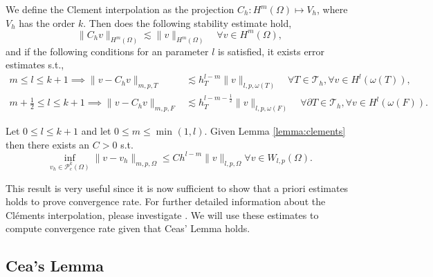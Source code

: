 \begin{lemma}
    \label{lemma:clements}

We define the Clement interpolation as the projection
$C_{h}: H^{m} \left( \Omega  \right) \mapsto V_{h}$, where $V_{h}$ has the order $k$. Then does the following stability estimate hold,
\[
 \| C_{h} v \|_{H^{m}\left( \Omega  \right)   }^{  } \lesssim \| v \|_{ H^{m}\left( \Omega  \right)  }^{  } \quad \forall v \in H^{m}\left( \Omega  \right),
\]
and if the following conditions for an parameter $l$ is satisfied, it exists error estimates s.t.,
\[
    \begin{split}
      m\le l \le k+1  \implies \| v - C_{h} v \|_{ m,p,T   }^{  }  &  \lesssim h^{l-m}_{T} \| v \|_{l,p,\omega \left( T \right)  }^{  } \quad  \forall T \in \mathcal{T} _{h}, \forall v \in H^{l}( \omega \left( T \right)
      ), \\
      m +\frac{1}{2}\le l \le k+1  \implies \| v - C_{h} v \|_{ m,p,F }^{  } & \lesssim h^{l-m- \frac{1}{2}}_{T} \| v \|_{l,p,\omega \left( F \right)  }^{  } \quad  \forall \partial T \in \mathcal{T} _{h}, \forall v \in H^{l}( \omega \left( F
      \right)).
    \end{split}
\]

\end{lemma}


\begin{corollary}
    \label{cor:celement_apriori}
    Let $0 \le l \le k+1$ and let $0\le m \le \min_{} ( 1,l )$.
    Given Lemma \ref{lemma:clements}  then there exists an $C > 0$ s.t.
    \[
    \inf_{v_{h} \in \mathcal{P} ^{k}_{c}( \Omega ) } \| v - v_{h} \|_{  m,p,\Omega }^{  } \le C h^{l-m}  \| v \|_{ l,p,\Omega  }^{  }    \forall v \in W_{l,p}( \Omega ).
    \]
\end{corollary}
This result is very useful since it is now sufficient to show that a priori estimates holds to prove convergence rate. For further detailed information about the Cléments interpolation, please investigate \cite[Chapter 1.6]{ern04}.
We will use these estimates to compute convergence rate given that Ceas' Lemma holds.

\subsection{Cea's Lemma}%
\label{sub:cea_s_lemma}




